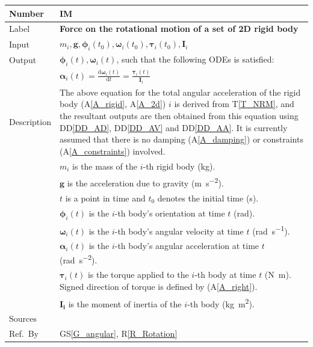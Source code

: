 \documentclass[12pt]{article}
\newcommand{\colAwidth}{0.13\textwidth}
\newcommand{\colBwidth}{0.82\textwidth}
\newcommand{\aref}[1]{A\ref{#1}}
\newcounter{instnum} %
\newcommand{\dt}{\mathrm{d}t}
\begin{document}
\noindent
\begin{minipage}{\textwidth}
	\renewcommand*{\arraystretch}{1.5}
	\begin{tabular}{| p{\colAwidth} | p{\colBwidth}|}
		\hline
		\rowcolor[gray]{0.9}
		Number & IM{instnum}\theinstnum \label{IM_FR}\\
		\hline
		Label & \bf Force on the rotational motion of a  set of 2D rigid body \\
		\hline
		Input &$m_i, \mathbf{g}, \boldsymbol{\phi}_i(t_0), \boldsymbol{\omega}_i(t_0), \boldsymbol{\tau}_i(t_0), \mathbf{I}_i$ \\
		\hline
		Output & $\boldsymbol{\phi}_i(t), \boldsymbol{\omega}_i(t)$, such that the following ODEs is satisfied: \\
		& $\boldsymbol{\alpha}_i(t) = \frac{\mathrm{d}\boldsymbol{\omega}_i(t)}{\dt} = \frac{\boldsymbol{\tau}_i(t)}{\mathbf{I}_i} $ \\
		\hline
		Description &                                                                                                                     
		The above equation for the total angular acceleration of the rigid body (\aref{A_rigid}, \aref{A_2d}) $i$ is 
             derived from T\ref{T_NRM}, and the resultant outputs are then obtained from this equation using DD\ref{DD_AD},
            DD\ref{DD_AV} and DD\ref{DD_AA}. It is currently assumed that there is no damping (\aref{A_damping}) or constraints (\aref{A_constraints}) involved. \\
		& $m_i$ is the mass of the $i$-th rigid body (\si{\kilogram}). \\
		& $\mathbf{g}$ is the acceleration due to gravity (\si{\metre\per\second\tothe{2}}). \\
		& $t$ is a point in time and $t_0$ denotes the initial time (\si{\second}). \\
		& $\boldsymbol{\phi}_i(t)$ is the $i$-th body's orientation at time $t$ (\si{\radian}). \\
		& $\boldsymbol{\omega}_i(t)$ is the $i$-th body's angular velocity at time $t$ (\si{\radian\per\second}). \\
		& $\boldsymbol{\alpha}_i(t)$ is the $i$-th body's angular acceleration at time $t$ (\si{\radian\per\second\tothe{2}}). \\
		& $\boldsymbol{\tau}_i(t)$ is the torque applied to the $i$-th body at time $t$ (\si{\newton\metre}).
            Signed direction of torque is defined by (\aref{A_right}). \\
		& $\mathbf{I_i}$ is the moment of inertia of the $i$-th body (\si{\kilogram\metre\tothe{2}}). \\
		\hline
		Sources & \\
		\hline
		Ref.\ By & GS\ref{G_angular}, R\ref{R_Rotation} \\
		\hline
	\end{tabular}
\end{minipage}
\end{document}
